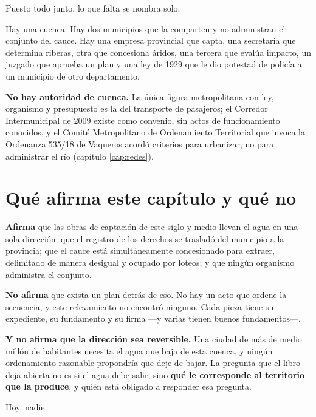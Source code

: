Puesto todo junto, lo que falta se nombra solo.

Hay una cuenca. Hay dos municipios que la comparten y no administran el conjunto del cauce.
Hay una empresa provincial que capta, una secretaría que determina riberas, otra que concesiona
áridos, una tercera que evalúa impacto, un juzgado que aprueba un plan y una ley de 1929 que le
dio potestad de policía a un municipio de otro departamento.

\textbf{No hay autoridad de cuenca.} La única figura metropolitana con ley, organismo y presupuesto es la del transporte de pasajeros; el Corredor Intermunicipal de 2009 existe como convenio, sin actos de funcionamiento conocidos, y el Comité Metropolitano de Ordenamiento Territorial que invoca la Ordenanza 535/18 de Vaqueros acordó criterios para urbanizar, no para administrar el río (capítulo \ref{cap:redes}).

\section{Qué afirma este capítulo y qué no}

\begin{cautela}
\textbf{Afirma} que las obras de captación de este siglo y medio llevan el agua en una sola
dirección; que el registro de los derechos se trasladó del municipio a la provincia; que el
cauce está simultáneamente concesionado para extraer, delimitado de manera desigual y ocupado
por loteos; y que ningún organismo administra el conjunto.

\textbf{No afirma} que exista un plan detrás de eso. No hay un acto que ordene la secuencia, y
este relevamiento no encontró ninguno. Cada pieza tiene su expediente, su fundamento y su firma
---y varias tienen buenos fundamentos---.

\textbf{Y no afirma que la dirección sea reversible.} Una ciudad de más de medio millón de
habitantes necesita el agua que baja de esta cuenca, y ningún ordenamiento razonable
propondría que deje de bajar. La pregunta que el libro deja abierta no es si el agua debe
salir, sino \textbf{qué le corresponde al territorio que la produce}, y quién está obligado a
responder esa pregunta.

Hoy, nadie.
\end{cautela}

